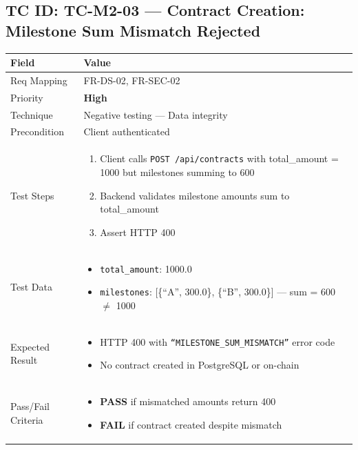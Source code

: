 \documentclass[12pt,a4paper]{article}
\newcommand{\sevhigh}{\textcolor{severityhigh}{\textbf{High}}}
\newcommand{\passresult}{\textcolor{passgreen}{\textbf{PASS}}}
\newcommand{\failresult}{\textcolor{failred}{\textbf{FAIL}}}
\begin{document}
\vspace{0.8cm}

\subsection{TC ID: TC-M2-03 --- Contract Creation: Milestone Sum Mismatch Rejected}

\begin{tabular}{|p{}|p{}|}
\hline
\rowcolor{lightblue} \textbf{Field} & \textbf{Value} \\
\hline
Req Mapping & FR-DS-02, FR-SEC-02 \\
\hline
Priority & \sevhigh \\
\hline
Technique & Negative testing --- Data integrity \\
\hline
Precondition & Client authenticated \\
\hline
Test Steps &
\begin{enumerate}[nosep, leftmargin=*]
  \item Client calls \texttt{POST /api/contracts} with total\_amount = 1000 but milestones summing to 600
  \item Backend validates milestone amounts sum to total\_amount
  \item Assert HTTP 400
\end{enumerate} \\
\hline
Test Data &
\begin{itemize}[nosep, leftmargin=*]
  \item \texttt{total\_amount}: 1000.0
  \item \texttt{milestones}: [\{``A'', 300.0\}, \{``B'', 300.0\}] --- sum = 600 $\neq$ 1000
\end{itemize} \\
\hline
Expected Result &
\begin{itemize}[nosep, leftmargin=*]
  \item HTTP 400 with \texttt{``MILESTONE\_SUM\_MISMATCH''} error code
  \item No contract created in PostgreSQL or on-chain
\end{itemize} \\
\hline
Pass/Fail Criteria &
\begin{itemize}[nosep, leftmargin=*]
  \item \passresult{} if mismatched amounts return 400
  \item \failresult{} if contract created despite mismatch
\end{itemize} \\
\hline
\end{tabular}
\end{document}
